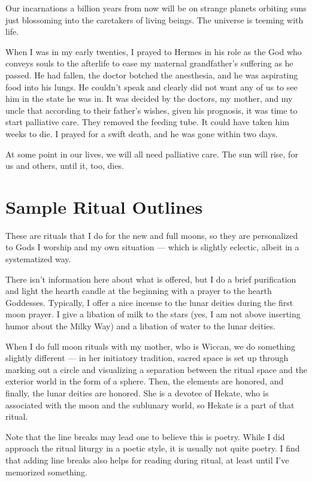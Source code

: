 \documentclass[
]{book}
\begin{document}
Our incarnations a billion years from now will be on strange planets orbiting suns just blossoming into the caretakers of living beings. The universe is teeming with life.

When I was in my early twenties, I prayed to Hermes in his role as the God who conveys souls to the afterlife to ease my maternal grandfather's suffering as he passed. He had fallen, the doctor botched the anesthesia, and he was aspirating food into his lungs. He couldn't speak and clearly did not want any of us to see him in the state he was in. It was decided by the doctors, my mother, and my uncle that according to their father's wishes, given his prognosis, it was time to start palliative care. They removed the feeding tube. It could have taken him weeks to die. I prayed for a swift death, and he was gone within two days.

At some point in our lives, we will all need palliative care. The sun will rise, for us and others, until it, too, dies.

\hypertarget{sample-ritual-outlines}{%
\section{Sample Ritual Outlines}\label{sample-ritual-outlines}}

These are rituals that I do for the new and full moons, so they are personalized to Gods I worship and my own situation --- which is slightly eclectic, albeit in a systematized way.

There isn't information here about what is offered, but I do a brief purification and light the hearth candle at the beginning with a prayer to the hearth Goddesses. Typically, I offer a nice incense to the lunar deities during the first moon prayer. I give a libation of milk to the stars (yes, I am not above inserting humor about the Milky Way) and a libation of water to the lunar deities.

When I do full moon rituals with my mother, who is Wiccan, we do something slightly different --- in her initiatory tradition, sacred space is set up through marking out a circle and visualizing a separation between the ritual space and the exterior world in the form of a sphere. Then, the elements are honored, and finally, the lunar deities are honored. She is a devotee of Hekate, who is associated with the moon and the sublunary world, so Hekate is a part of that ritual.

Note that the line breaks may lead one to believe this is poetry. While I did approach the ritual liturgy in a poetic style, it is usually not quite poetry. I find that adding line breaks also helps for reading during ritual, at least until I've memorized something.
\end{document}
